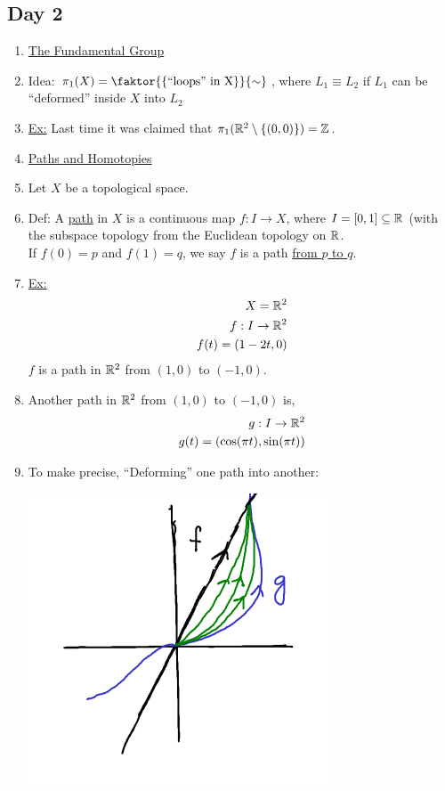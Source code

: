 \subsection{Day 2}
    \begin{enumerate}
        \item\underline{The Fundamental Group}
        \item Idea: $\pi_1(X)=\faktor{\{\text{``loops'' in X}\}}{\sim}$, where $L_1 \equiv L_2$ if $L_1$ can be ``deformed'' inside $X$
            into $L_2$
        \item \underline{Ex:} Last time it was claimed that $\pi_1(\mathbb{R}^2\setminus \{(0,0)\})=\mathbb{Z}$.
        \item\underline{Paths and Homotopies}
        \item Let $X$ be a topological space.
        \item Def: A \underline{path} in $X$ is a continuous map $f:I \rightarrow X$, where $I=[0,1]\subseteq \mathbb{R}$ (with the
            subspace topology from the Euclidean topology on $\mathbb{R}$.\\
            If $f(0)=p$ and $f(1)=q$, we say $f$ is a path \underline{from $p$ to $q$}.
        \item \underline{Ex:}
            \begin{align*}
                X=\mathbb{R}^2\\
                f: I \rightarrow\mathbb{R}^2\\
                f(t)=(1-2t,0)\\
            \end{align*}
            $f$ is a path in $\mathbb{R}^2$ from $(1,0)$ to $(-1,0)$.
        \item Another path in $\mathbb{R}^2$ from $(1,0)$ to $(-1,0)$ is,
            \begin{align*}
                g: I \rightarrow \mathbb{R}^2\\
                g(t)=(\cos(\pi t),\sin(\pi t))\\
            \end{align*}
        \item To make precise, ``Deforming'' one path into another:\\
            \begin{minipage}[c]{\linewidth}
                \begin{center}
                    \includegraphics[]{images/homotopy_class_2.png}

\end{center}
\end{minipage}
\end{enumerate}
